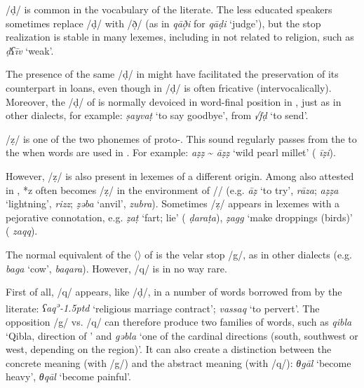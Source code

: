 \documentclass[output=paper]{langsci/langscibook}
\begin{document}
/ḍ/ is common in the vocabulary of the literate. The less educated speakers sometimes replace /ḍ/ with /ð̣/ (as in \textit{qāð̣i} for \textit{qāḍi} ‘judge’), but the stop realization is stable in many lexemes, including in  not related to religion, such as \textit{ḍʕīv} ‘weak’.

The presence of the same  /ḍ/ in  might have facilitated the preservation of its counterpart in   loans, even though in  /ḍ/ is often fricative (intervocalically). Moreover, the /ḍ/ of  is normally devoiced in word-final position in , just as in other  dialects, for example: \textit{ṣayvaṭ} ‘to say goodbye’, from  \textit{√fḍ} ‘to send’.

/ẓ/ is one of the two  phonemes of proto-. This   sound regularly passes from the  to the  when  words are used in . For example: \textit{aẓẓ} \~{} \textit{āẓẓ} ‘wild pearl millet’ ( \textit{īẓi}).

However, /ẓ/ is also present in lexemes of a different origin. Among   also attested in  , *z often becomes /ẓ/ in the environment of /{\R}/ (e.g. \textit{{\R}āẓ} ‘to try’,  \textit{rāza}; \textit{{\R}aẓẓa} ‘lightning’,  \textit{rizz}; \textit{ẓəb{\R}a} ‘anvil’,  \textit{zubra}). Sometimes /ẓ/ appears in lexemes with a pejorative connotation, e.g. \textit{ẓ{\R}aṭ} ‘fart; lie’ ( \textit{ḍaraṭa}), \textit{ẓagg} ‘make droppings (birds)’ ( \textit{zaqq}).

The normal equivalent of the 〈{}〉 of   is the velar stop /g/, as in other  dialects (e.g. \textit{bag{\R}a} ‘cow’,  \textit{baqara}). However, /q/ is in no way rare.

First of all, /q/ appears, like /ḍ/, in a number of words borrowed from   by the literate: \textit{ʕaq\kern 0.5pt\textsuperscript{ə}\kern -1.5ptd} ‘religious marriage contract’; \textit{vassaq} ‘to pervert’. The opposition /g/ vs. /q/ can therefore produce two families of words, such as \textit{qibla} ‘Qibla, direction of ’ and \textit{gəbla} ‘one of the cardinal directions (south, southwest or west, depending on the region)’. It can also create a distinction between the concrete meaning (with /g/) and the abstract meaning (with /q/): \textit{θgāl} ‘become heavy’, \textit{θqāl} ‘become painful’.
\end{document}
